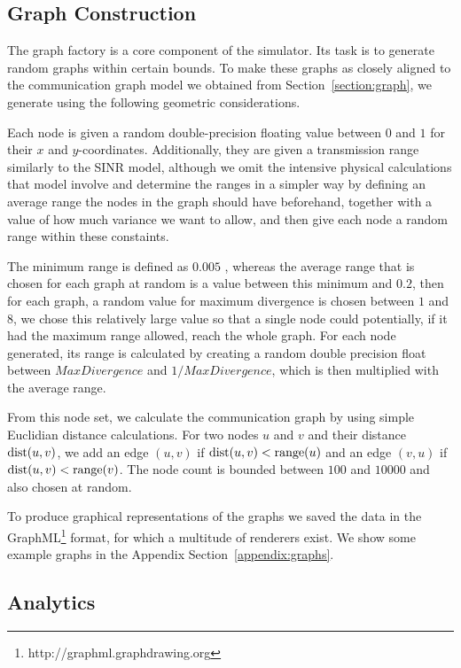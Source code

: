 \subsection{Graph Construction}

The graph factory is a core component of the simulator. Its task is to generate random graphs within certain bounds. To make these graphs as closely aligned to the communication graph model we obtained from Section~\ref{section:graph}, we generate using the following geometric considerations.

Each node is given a random double-precision floating value between $0$ and $1$ for their $x$ and $y$-coordinates. Additionally, they are given a transmission range similarly to the SINR model, although we omit the intensive physical calculations that model involve and determine the ranges in a simpler way by defining an average range the nodes in the graph should have beforehand, together with a value of how much variance we want to allow, and then give each node a random range within these constaints.

The minimum range is defined as $0.005$ , whereas the average range that is chosen for each graph at random is a value between this minimum and $0.2$, then for each graph, a random value for maximum divergence is chosen between $1$ and $8$, we chose this relatively large value so that a single node could potentially, if it had the maximum range allowed, reach the whole graph. For each node generated, its range is calculated by creating a random double precision float between $MaxDivergence$ and $1/MaxDivergence$, which is then multiplied with the average range.

From this node set, we calculate the communication graph by using simple Euclidian distance calculations. For two nodes $u$ and $v$ and their distance $\operatorname{dist}(u, v)$, we add an edge $(u,v)$ if $\operatorname{dist}(u, v) < \operatorname{range}(u)$ and an edge $(v,u)$ if $\operatorname{dist}(u, v) < \operatorname{range}(v)$. The node count is bounded between $100$ and $10000$ and also chosen at random.

To produce graphical representations of the graphs we saved the data in the GraphML\footnote{http://graphml.graphdrawing.org} format, for which a multitude of renderers exist. We show some example graphs in the Appendix Section~\ref{appendix:graphs}.

\subsection{Analytics}


